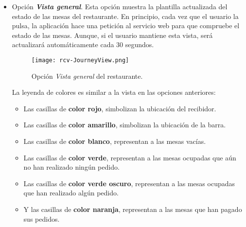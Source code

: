 \begin{itemize}
Cuando un cliente \acs{NFC} notifica su salida y ya ha pagado (de forma
tradicional) sus pedidos, aparecerá automáticamente la siguiente interfaz 
(figura \ref{fig:rcv-JourneyExitNFC}).

  \begin{figure}[ht]
    \begin{center}
      \texttt{[image: rcv-JourneyExitNFC.png]}
      \caption{Se marcha cliente \acs{NFC}.}
      \label{fig:rcv-JourneyExitNFC}
    \end{center}
  \end{figure}

Para liberar su mesa, simplemente hay que pulsar \emph{Aceptar}.

\item Opción \textbf{\emph{Vista general}}. Esta opción muestra la plantilla
actualizada del estado de las mesas del restaurante. En principio, cada vez que 
el usuario la pulsa, la aplicación hace una petición al servicio web para que 
compruebe el estado de las mesas. Aunque, si el usuario mantiene esta vista,
será actualizará automáticamente cada 30 segundos.

  \begin{figure}[ht]
    \begin{center}
      \texttt{[image: rcv-JourneyView.png]}
      \caption{Opción \emph{Vista general} del restaurante.}
      \label{fig:rcv-JourneyView}
    \end{center}
  \end{figure}

La leyenda de colores es similar a la vista en las opciones anteriores:
  \begin{itemize}
  \item Las casillas de \textbf{color rojo}, simbolizan la ubicación del
  recibidor.
  \item Las casillas de \textbf{color amarillo}, simbolizan la ubicación de la
  barra.
  \item Las casillas de \textbf{color blanco}, representan a las mesas vacías.
  \item Las casillas de \textbf{color verde}, representan a las mesas ocupadas
  que aún no han realizado ningún pedido.
  \item Las casillas de \textbf{color verde oscuro}, representan a las mesas
  ocupadas que han realizado algún pedido.
  \item Y las casillas de \textbf{color naranja}, representan a las mesas que
  han pagado sus pedidos.
  \end{itemize}


\end{itemize}

